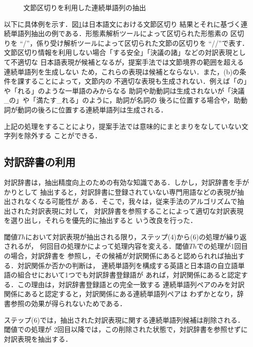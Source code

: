 \begin{figure}[t]
  \begin{center}
    \epsfxsize=9cm 
  \end{center}
  \caption{文節区切りを利用した連続単語列の抽出}
  \label{文節区切り利用連続単語列抽出}
\end{figure}


\noindent
以下に具体例を示す．図\ref{文節区切り利用連続単語列抽出}は日本語文における文節区切り
結果とそれに基づく連続単語列抽出の例である．形態素解析ツールによって区切られた形態素の
区切りを ``/''，係り受け解析ツールによって区切られた文節の区切りを ``//''で表す．
文節区切り情報を利用しない場合「する安全」「決議の諸」などの対訳表現として不適切な
日本語表現が候補となるが，提案手法では文節境界の範囲を超える連続単語列を生成しない
ため，これらの表現は候補とならない．また，(b)の条件を課することによって，文節内の
不適切な表現も生成されない．例えば「の」や「れる」のような一単語のみからなる
助詞や助動詞は生成されないが「決議\_の」や「満たす\_れる」のように，助詞が名詞の
後ろに位置する場合や，助動詞が動詞の後ろに位置する連続単語列は生成される．

上記の処理をすることにより，提案手法では意味的にまとまりをなしていない文字列を除外する
ことができる．

\subsection{対訳辞書の利用}

対訳辞書は，抽出精度向上のための有効な知識である．しかし，対訳辞書を手がかりとして
抽出すると，対訳辞書に登録されていない専門用語などの表現が抽出されなくなる可能性が
ある．そこで，我々は，従来手法のアルゴリズムで抽出された対訳表現に対して，
対訳辞書を参照することによって適切な対訳表現を選り出し，それらを優先的に抽出すると
いう改良を行った．

閾値$Th$において対訳表現が抽出される限り，ステップ(4)から(6)の処理が繰り返されるが，
何回目の処理かによって処理内容を変える．閾値$Th$での処理が1回目の場合，対訳辞書を
参照し，その候補が対訳関係にあると認められれば抽出する．対訳関係か否かの判断は，
連続単語列を構成する英語と日本語の自立語単語の組合せにおいて1つでも対訳辞書登録語が
あれば，対訳関係にあると認定する．この理由は，対訳辞書登録語との完全一致する
連続単語列ペアのみを対訳関係にあると認定すると，対訳関係にある連続単語列ペアは
わずかとなり，辞書参照の効果が得られないためである．

ステップ(6)では，抽出された対訳表現に関する連続単語列候補は削除される．閾値での処理が
2回目以降では，この削除された状態で，対訳辞書を参照せずに対訳表現を抽出する．

